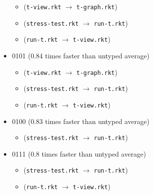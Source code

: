 \documentclass{article}
\newcommand{\mono}[1]{\texttt{#1}}
\begin{document}
\begin{itemize}
\begin{itemize}
  \item (\mono{t-view.rkt} $\rightarrow$ \mono{t-graph.rkt})
  \item (\mono{stress-test.rkt} $\rightarrow$ \mono{run-t.rkt})
  \item (\mono{run-t.rkt} $\rightarrow$ \mono{t-view.rkt})
  \end{itemize}
\item 0101 (0.84 times faster than untyped average)
  \begin{itemize}
  \item (\mono{t-view.rkt} $\rightarrow$ \mono{t-graph.rkt})
  \item (\mono{stress-test.rkt} $\rightarrow$ \mono{run-t.rkt})
  \item (\mono{run-t.rkt} $\rightarrow$ \mono{t-view.rkt})
  \end{itemize}
\item 0100 (0.83 times faster than untyped average)
  \begin{itemize}
  \item (\mono{stress-test.rkt} $\rightarrow$ \mono{run-t.rkt})
  \end{itemize}
\item 0111 (0.8 times faster than untyped average)
  \begin{itemize}
  \item (\mono{stress-test.rkt} $\rightarrow$ \mono{run-t.rkt})
  \item (\mono{run-t.rkt} $\rightarrow$ \mono{t-view.rkt})
  \end{itemize}


\end{itemize}
\end{document}
